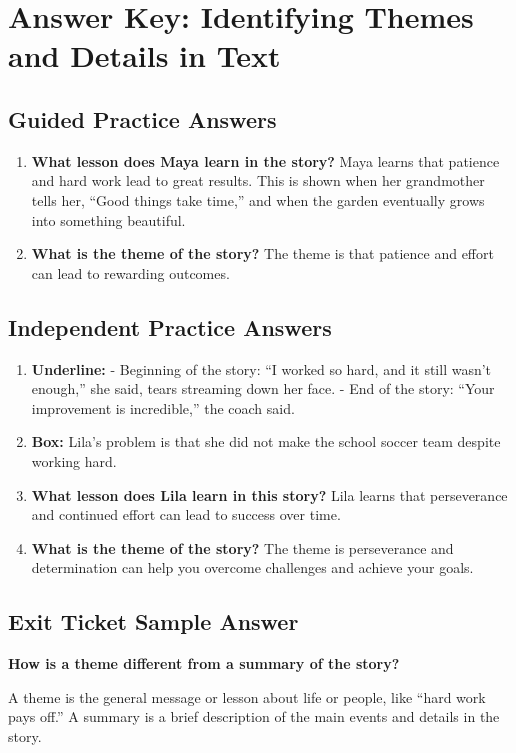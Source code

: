 \documentclass[12pt]{article}
\begin{document}
\section*{Answer Key: Identifying Themes and Details in Text}

\subsection*{Guided Practice Answers}
\begin{enumerate}
    \item \textbf{What lesson does Maya learn in the story?}
    Maya learns that patience and hard work lead to great results. This is shown when her grandmother tells her, “Good things take time,” and when the garden eventually grows into something beautiful.
    
    \item \textbf{What is the theme of the story?}
    The theme is that patience and effort can lead to rewarding outcomes.
\end{enumerate}

\subsection*{Independent Practice Answers}
\begin{enumerate}
    \item \textbf{Underline:} 
    - Beginning of the story: “I worked so hard, and it still wasn’t enough,” she said, tears streaming down her face.
    - End of the story: “Your improvement is incredible,” the coach said.

    \item \textbf{Box:} Lila’s problem is that she did not make the school soccer team despite working hard.

    \item \textbf{What lesson does Lila learn in this story?}
    Lila learns that perseverance and continued effort can lead to success over time.

    \item \textbf{What is the theme of the story?}
    The theme is perseverance and determination can help you overcome challenges and achieve your goals.
\end{enumerate}

\subsection*{Exit Ticket Sample Answer}
\textbf{How is a theme different from a summary of the story?}

A theme is the general message or lesson about life or people, like “hard work pays off.” A summary is a brief description of the main events and details in the story.
\end{document}
